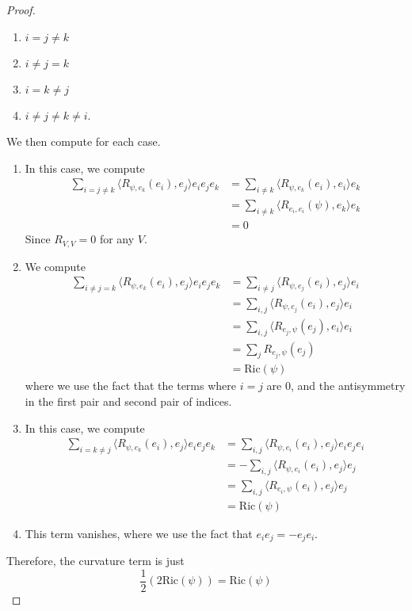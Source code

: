 \begin{proof}
\begin{enumerate}
  \item $i = j \neq k$
  \item $i \neq j = k$
  \item $i = k \neq j$
  \item $i \neq j \neq k \neq i$.
\end{enumerate}
We then compute for each case.
\begin{enumerate}
  \item In this case, we compute
  \begin{align*}
  \sum_{i =j \neq k}\langle R_{\psi,e_k}(e_i), e_j\rangle e_ie_je_k
  &= \sum_{i \neq k} \langle R_{\psi,e_k}(e_i), e_i\rangle e_k \\
  &= \sum_{i \neq k} \langle R_{e_i,e_i}(\psi), e_k\rangle e_k \\
  &= 0
  \end{align*}
  Since $R_{V,V} = 0$ for any $V$.
  \item We compute
  \begin{align*}
  \sum_{i \neq j = k}\langle R_{\psi,e_k}(e_i), e_j\rangle e_ie_je_k
  &= \sum_{i \neq j} \langle R_{\psi, e_j}(e_i), e_j\rangle e_i \\
  &= \sum_{i,j} \langle R_{\psi, e_j}(e_i), e_j \rangle e_i \\
  &= \sum_{i,j} \langle R_{e_j, \psi}(e_j),e_i \rangle e_i \\
  &= \sum_{j} R_{e_j, \psi}(e_j) \\
  &= \mathrm{Ric}(\psi)
  \end{align*}
  where we use the fact that the terms where $i = j$ are $0$, and the antisymmetry
  in the first pair and second pair of indices.
  \item In this case, we compute
  \begin{align*}
  \sum_{i = k \neq j}\langle R_{\psi,e_k}(e_i), e_j\rangle e_ie_je_k
  &= \sum_{i,j} \langle R_{\psi, e_i}(e_i), e_j \rangle e_ie_je_i \\
  &= -\sum_{i,j} \langle R_{\psi, e_i}(e_i), e_j \rangle e_j \\
  &= \sum_{i,j} \langle R_{e_i, \psi}(e_i) , e_j \rangle e_j \\
  &= \mathrm{Ric}(\psi)
  \end{align*}
  \item This term vanishes, where we use the fact that $e_ie_j = -e_je_i$.
\end{enumerate}
Therefore, the curvature term is just
\[
\frac{1}{2} \left( 2\mathrm{Ric}(\psi) \right) = \mathrm{Ric}(\psi)
\]
\end{proof}
